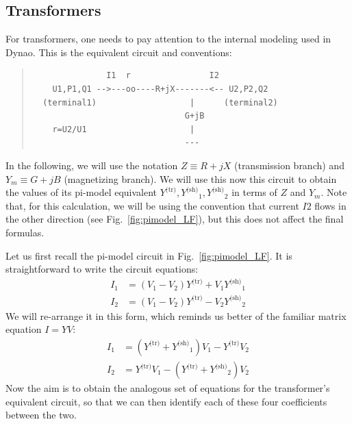 \documentclass[a4paper,11pt]{article}
\newcommand{\Dynawo}{Dyna\textomega o} %
\newcommand{\Ytr}{\ensuremath{Y^{\textrm{(tr)}}}}
\newcommand{\Ysh}{\ensuremath{Y^{\textrm{(sh)}}}}
\begin{document}
\subsection{Transformers}

For transformers, one needs to pay attention to the internal modeling used in \Dynawo.
This is the equivalent circuit and conventions:
\begin{quote}
  \begin{verbatim}
               I1  r                I2
    U1,P1,Q1 -->---oo----R+jX-------<-- U2,P2,Q2
  (terminal1)                   |      (terminal2)
                               G+jB
    r=U2/U1                     |
                               ---
  \end{verbatim}
\end{quote}
In the following, we will use the notation $Z \equiv R+jX$ (transmission branch)
and $Y_m \equiv G + jB$ (magnetizing branch).  We will use this now this circuit
to obtain the values of its pi-model equivalent $\Ytr, \Ysh_1, \Ysh_2$ in terms of
$Z$ and $Y_m$. Note that, for this calculation, we will be using the convention
that current $I2$ flows in the other direction (see Fig.~\ref{fig:pimodel_LF}),
but this does not affect the final formulas.

Let us first recall the pi-model circuit in Fig.~\ref{fig:pimodel_LF}. It is
straightforward to write the circuit equations:
\begin{equation*}
  \begin{split}
    I_1 & = (V_1 - V_2) \Ytr + V_1 \Ysh_1 \\
    I_2 & = \left(V_1 - V_2\right) \Ytr - V_2 \Ysh_2
  \end{split}
\end{equation*}
We will re-arrange it in this form, which reminds us better of the familiar
matrix equation $I = Y V$:
\begin{equation}
  \label{eq:pimodelIV}
  \begin{split}
    I_1 & = \left( \Ytr + \Ysh_1 \right) V_1 - \Ytr V_2 \\
    I_2 & = \Ytr V_1 - \left( \Ytr + \Ysh_2 \right) V_2
  \end{split}
\end{equation}
Now the aim is to obtain the analogous set of equations for the transformer's
equivalent circuit, so that we can then identify each of these four
coefficients between the two.
\end{document}
